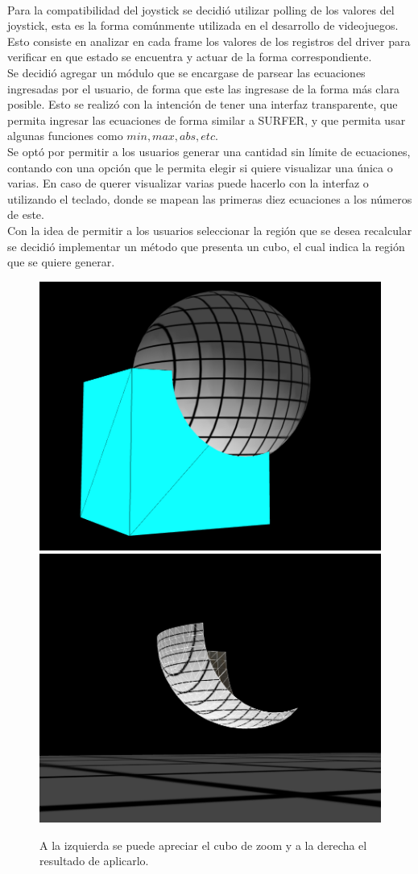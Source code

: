 \documentclass[12pt]{article}
\begin{document}
\\Para la compatibilidad del joystick se decidió utilizar polling de los valores del joystick, esta es la forma comúnmente utilizada en el desarrollo de videojuegos\cite{engine}. Esto consiste en analizar en cada frame los valores de los registros del driver para verificar en que estado se encuentra y actuar de la forma correspondiente.
\\Se decidió agregar un módulo que se encargase de parsear las ecuaciones ingresadas por el usuario, de forma que este las ingresase de la forma más clara posible. Esto se realizó con la intención de tener una interfaz transparente, que permita ingresar las ecuaciones de forma similar a SURFER, y que permita usar algunas funciones como $min, max, abs, etc$.
\\Se optó por permitir a los usuarios generar una cantidad sin límite de ecuaciones, contando con una opción que le permita elegir si quiere visualizar una única o varias. En caso de querer visualizar varias puede hacerlo con la interfaz o utilizando el teclado, donde se mapean las primeras diez ecuaciones a los números de este. 
\\Con la idea de permitir a los usuarios seleccionar la región que se desea recalcular se decidió implementar un método que presenta un cubo, el cual indica la región que se quiere generar.
\begin{figure}[h!]
\includegraphics[width =0.45\linewidth]{cubo1.png}
\hfill
\includegraphics[width =0.45\linewidth]{cubo2.png}
\caption{ A la izquierda se puede apreciar el cubo de zoom y a la derecha el resultado de aplicarlo.}
\label{ fig : surface }
\end{figure}
\clearpage
\end{document}
